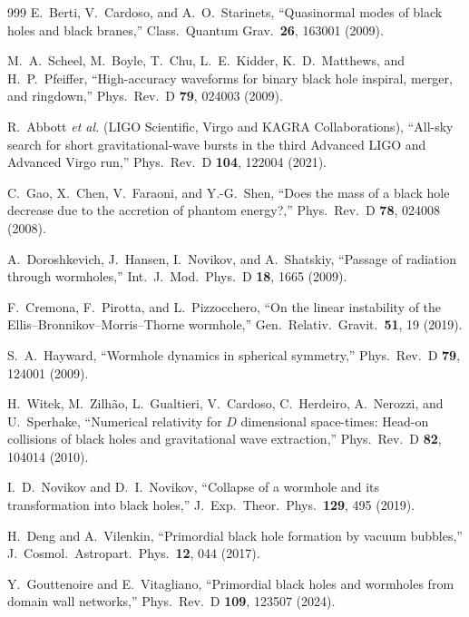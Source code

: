 \documentclass[twocolumn,floatfix,aps,prd,superscriptaddress,nofootinbib]{revtex4-2}
\begin{document}
\begin{thebibliography}{999}
E.~Berti, V.~Cardoso, and A.~O.~Starinets,
\newblock ``Quasinormal modes of black holes and black branes,''
\newblock Class.\ Quantum Grav.\ \textbf{26}, 163001 (2009).

M.~A.~Scheel, M.~Boyle, T.~Chu, L.~E.~Kidder, K.~D.~Matthews, and H.~P.~Pfeiffer,
\newblock ``High-accuracy waveforms for binary black hole inspiral, merger, and ringdown,''
\newblock Phys.\ Rev.\ D \textbf{79}, 024003 (2009).

R.~Abbott \emph{et al.} (LIGO Scientific, Virgo and KAGRA Collaborations),
\newblock ``All-sky search for short gravitational-wave bursts in the third Advanced LIGO and Advanced Virgo run,''
\newblock Phys.\ Rev.\ D \textbf{104}, 122004 (2021).

C.~Gao, X.~Chen, V.~Faraoni, and Y.-G.~Shen,
\newblock ``Does the mass of a black hole decrease due to the accretion of phantom energy?,''
\newblock Phys.\ Rev.\ D \textbf{78}, 024008 (2008).

A.~Doroshkevich, J.~Hansen, I.~Novikov, and A.~Shatskiy,
\newblock ``Passage of radiation through wormholes,''
\newblock Int.\ J.\ Mod.\ Phys.\ D \textbf{18}, 1665 (2009).

F.~Cremona, F.~Pirotta, and L.~Pizzocchero,
\newblock ``On the linear instability of the Ellis--Bronnikov--Morris--Thorne wormhole,''
\newblock Gen.\ Relativ.\ Gravit.\ \textbf{51}, 19 (2019).

S.~A.~Hayward,
\newblock ``Wormhole dynamics in spherical symmetry,''
\newblock Phys.\ Rev.\ D \textbf{79}, 124001 (2009).

H.~Witek, M.~Zilh\~ao, L.~Gualtieri, V.~Cardoso, C.~Herdeiro, A.~Nerozzi, and U.~Sperhake,
\newblock ``Numerical relativity for $D$ dimensional space-times: Head-on collisions of black holes and gravitational wave extraction,''
\newblock Phys.\ Rev.\ D \textbf{82}, 104014 (2010).

I.~D.~Novikov and D.~I.~Novikov,
\newblock ``Collapse of a wormhole and its transformation into black holes,''
\newblock J.\ Exp.\ Theor.\ Phys.\ \textbf{129}, 495 (2019).

H.~Deng and A.~Vilenkin,
\newblock ``Primordial black hole formation by vacuum bubbles,''
\newblock J.\ Cosmol.\ Astropart.\ Phys.\ \textbf{12}, 044 (2017).

Y.~Gouttenoire and E.~Vitagliano,
\newblock ``Primordial black holes and wormholes from domain wall networks,''
\newblock Phys.\ Rev.\ D \textbf{109}, 123507 (2024).


\end{thebibliography}
\end{document}
